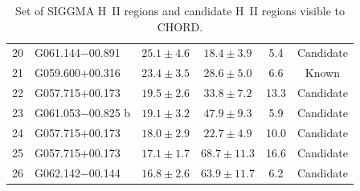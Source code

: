 \begin{table}[H]
\begin{tabular}{l l c c c c}
        20 & G061.144$-$00.891 & $25.1 \pm 4.6$ & $18.4 \pm 3.9$ & 5.4 & Candidate \\
        21 & G059.600$+$00.316 & $23.4 \pm 3.5$ & $28.6 \pm 5.0$ & 6.6 & Known \\
        22 & G057.715$+$00.173 & $19.5 \pm 2.6$ & $33.8 \pm 7.2$ & 13.3 & Candidate \\
        23 & G061.053$-$00.825 b & $19.1 \pm 3.2$ & $47.9 \pm 9.3$ & 5.9 & Candidate \\
        24 & G057.715$+$00.173 & $18.0 \pm 2.9$ & $22.7 \pm 4.9$ & 10.0 & Candidate \\
        25 & G057.715$+$00.173 & $17.1 \pm 1.7$ & $68.7 \pm 11.3$ & 16.6 & Candidate \\
        26 & G062.142$-$00.144 & $16.8 \pm 2.6$ & $63.9 \pm 11.7$ & 6.2 & Candidate \\
        \bottomrule
    \end{tabular}
    \caption{Set of SIGGMA H~II regions and candidate H~II regions visible to CHORD.}
    \label{tab:siggma_candidates}
\end{table}
